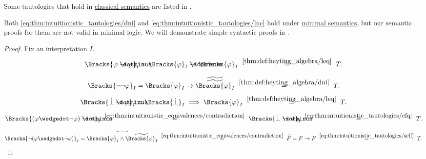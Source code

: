 \begin{comments}
  \item Some tautologies that hold in \hyperref[def:propositional_semantics]{classical semantics} are listed in .
  \item Both \eqref{eq:thm:intuitionistic_tautologies/dni} and \eqref{eq:thm:intuitionistic_tautologies/lnc} hold under \hyperref[def:minimal_propositional_semantics]{minimal semantics}, but our semantic proofs for them are not valid in minimal logic. We will demonstrate simple syntactic proofs in .
\end{comments}
\begin{proof}
  Fix an interpretation \( I \).

  \begin{equation*}
    \Bracks{\varphi \synimplies \varphi}_I
    =
    \Bracks{\varphi}_I \synimplies \Bracks{\varphi}_I
    \reloset {\ref{thm:def:heyting_algebra/leq}} =
    T.
  \end{equation*}

  \begin{equation*}
    \Bracks{\neg \neg \varphi}_I
    =
    \Bracks{\varphi}_I \rightarrow \widetilde{\widetilde{\Bracks{\varphi}_I}}
    \reloset {\ref{thm:def:heyting_algebra/dni}} =
    T.
  \end{equation*}

  \begin{equation*}
    \Bracks{\synbot \synimplies \varphi}_I
    =
    \Bracks{\synbot}_I \implies \Bracks{\varphi}_I
    \reloset {\ref{thm:def:heyting_algebra/leq}} =
    T.
  \end{equation*}

  \begin{equation*}
    \Bracks{(\varphi \synwedge \neg \varphi) \synimplies \psi}_I
    \reloset {\eqref{eq:thm:intuitionistic_equivalences/contradiction}} =
    \Bracks{\synbot \synimplies \psi}_I
    \reloset {\eqref{eq:thm:intuitionistic_tautologies/efq}} =
    T.
  \end{equation*}

  \begin{equation*}
    \Bracks{\synneg (\varphi \synwedge \synneg \varphi)}_I
    =
    \widetilde{\Bracks{\varphi}_I \wedge \widetilde{\Bracks{\varphi}_I}}
    \reloset {\eqref{eq:thm:intuitionistic_equivalences/contradiction}} =
    \widetilde{F}
    =
    F \rightarrow F
    \reloset {\eqref{eq:thm:intuitionistic_tautologies/self}} =
    T.
  \end{equation*}
\end{proof}

